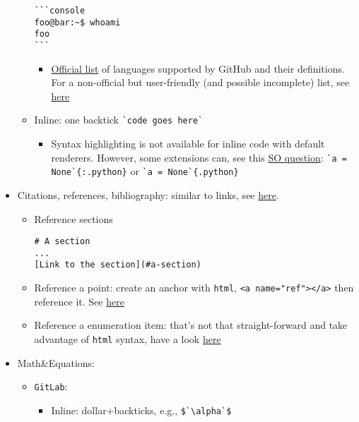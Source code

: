 \documentclass[a4paper,12pt,%
              final%
              ]{article}
\begin{document}
\begin{itemize}
\begin{itemize}
\begin{verbatim}
```console
foo@bar:~$ whoami
foo
```
\end{verbatim}
        \begin{itemize}
          \item \href{https://github.com/github-linguist/linguist/blob/3c3b037910006fc2f1a9bb34b2c4e9cde062206c/lib/linguist/languages.yml}{Official list} of languages supported by GitHub and their definitions. For a non-official but user-friendly (and possible incomplete) list, see \href{https://github.com/jincheng9/markdown_supported_languages?tab=readme-ov-file#heres-a-full-list-of-supported-languages}{here}
        \end{itemize}
      \item Inline: one backtick \verb|`code goes here`|
        \begin{itemize}
          \item Syntax highlighting is not available for inline code with default renderers. However, some extensions can, see this \href{https://stackoverflow.com/questions/23226224/inline-code-syntax-highlighting-in-github-markdown}{SO question}: \verb|`a = None`{:.python}| or \verb|`a = None`{.python}|
        \end{itemize}
    \end{itemize}
  \item Citations, references, bibliography: similar to links, see \href{https://stackoverflow.com/questions/26587527/cite-a-paper-using-github-markdown-syntax}{here}.
    \begin{itemize}
      \item Reference sections
\begin{verbatim}
# A section
...
[Link to the section](#a-section)
\end{verbatim}
      \item Reference a point: create an anchor with \texttt{html}, \verb|<a name="ref"></a>| then reference it. See \href{https://stackoverflow.com/a/7335259/12152457}{here}
      \item Reference a enumeration item: that's not that straight-forward and take advantage of \texttt{html} syntax, have a look \href{https://stackoverflow.com/a/37148268/12152457}{here}
    \end{itemize}
  \item Math\&Equations:
    \begin{itemize}
      \item \texttt{GitLab}:
        \begin{itemize}
          \item Inline: dollar+backticks, e.g., \verb|$`\alpha`$|

\end{itemize}
\end{itemize}
\end{itemize}
\end{document}
